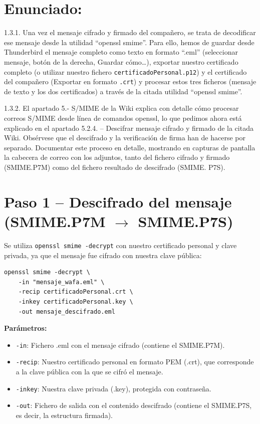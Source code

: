 \section{Enunciado:}
1.3.1. Una vez el mensaje cifrado y firmado del compañero, se trata de decodificar ese mensaje desde la
utilidad ``openssl smime''. Para ello, hemos de guardar desde Thunderbird el mensaje completo como texto en
formato ``.eml'' (seleccionar mensaje, botón de la derecha, Guardar cómo\dots), exportar nuestro certificado
completo (o utilizar nuestro fichero \texttt{certificadoPersonal.p12}) y el certificado del compañero (Exportar en
formato \texttt{.crt}) y procesar estos tres ficheros (mensaje de texto y los dos certificados) a través de la citada
utilidad ``openssl smime''.

1.3.2. El apartado 5.- S/MIME de la Wiki explica con detalle cómo procesar correos S/MIME desde línea de
comandos openssl, lo que pedimos ahora está explicado en el apartado 5.2.4. -- Descifrar mensaje cifrado y
firmado de la citada Wiki. Obsérvese que el descifrado y la verificación de firma han de hacerse por
separado. Documentar este proceso en detalle, mostrando en capturas de pantalla la cabecera de correo
con los adjuntos, tanto del fichero cifrado y firmado (SMIME.P7M) como del fichero resultado de
descifrado (SMIME. P7S).

\section{Paso 1 -- Descifrado del mensaje (SMIME.P7M $\rightarrow$ SMIME.P7S)}

Se utiliza \texttt{openssl smime -decrypt} con nuestro certificado personal y clave privada, ya que el mensaje fue cifrado con nuestra clave pública:

\begin{lstlisting}[caption=Descifrado del mensaje S/MIME]
openssl smime -decrypt \
    -in "mensaje_wafa.eml" \
    -recip certificadoPersonal.crt \
    -inkey certificadoPersonal.key \
    -out mensaje_descifrado.eml
\end{lstlisting}

\textbf{Parámetros:}
\begin{itemize}[label=\textbullet]
    \item \texttt{-in}: Fichero .eml con el mensaje cifrado (contiene el SMIME.P7M).
    \item \texttt{-recip}: Nuestro certificado personal en formato PEM (.crt), que corresponde a la clave pública con la que se cifró el mensaje.
    \item \texttt{-inkey}: Nuestra clave privada (.key), protegida con contraseña.
    \item \texttt{-out}: Fichero de salida con el contenido descifrado (contiene el SMIME.P7S, es decir, la estructura firmada).
\end{itemize}

